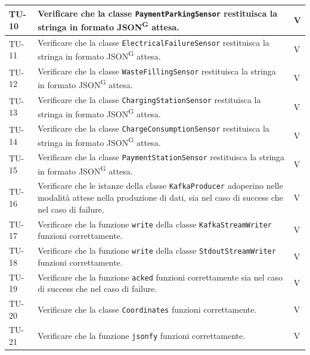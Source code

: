 \documentclass[8pt]{article}
\newcommand{\glossterm}[1]{#1\textsuperscript{G}} %
\begin{document}
\begin{longtable}{|>{\centering}p{2cm}|>{\RaggedRight}m{12cm}|>{\centering\arraybackslash}p{2cm}|}
    TU-10 & Verificare che la classe \verb|PaymentParkingSensor| restituisca la stringa in formato \glossterm{JSON} attesa. & V \\
    \hline

    TU-11 & Verificare che la classe \verb|ElectricalFailureSensor| restituisca la stringa in formato \glossterm{JSON} attesa. & V \\
    \hline
    
    TU-12 & Verificare che la classe \verb|WasteFillingSensor| restituisca la stringa in formato \glossterm{JSON} attesa. & V \\
    \hline

    TU-13 & Verificare che la classe \verb|ChargingStationSensor| restituisca la stringa in formato \glossterm{JSON} attesa. & V \\
    \hline

    TU-14 & Verificare che la classe \verb|ChargeConsumptionSensor| restituisca la stringa in formato \glossterm{JSON} attesa. & V \\
    \hline

    TU-15 & Verificare che la classe \verb|PaymentStationSensor| restituisca la stringa in formato \glossterm{JSON} attesa. & V \\
    \hline
    
    TU-16 & Verificare che le istanze della classe \verb|KafkaProducer| adoperino nelle modalità attese nella produzione di dati, sia nel caso di success che nel caso di failure. & V \\
    \hline

    TU-17 & Verificare che la funzione \verb|write| della classe \verb|KafkaStreamWriter| funzioni correttamente. & V \\
    \hline

    TU-18 & Verificare che la funzione \verb|write| della classe
    \verb|StdoutStreamWriter| funzioni correttamente. & V \\
    \hline

    TU-19 & Verificare che la funzione \verb|acked| funzioni correttamente sia nel caso di success che nel caso di failure. & V \\
    \hline

    TU-20 & Verificare che la classe \verb|Coordinates| funzioni correttamente. & V \\
    \hline

    TU-21 & Verificare che la funzione \verb|jsonfy| funzioni correttamente. & V \\
    \hline

\end{longtable}
\clearpage
\end{document}
